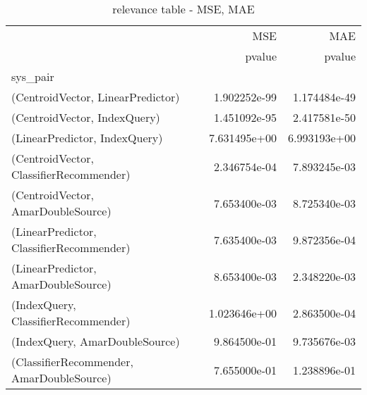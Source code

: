 \documentclass[11pt]{article}
\begin{document}
\begin{table}[H]
\centering
\caption{relevance table - MSE, MAE}
\begin{tabular}{lrr}
\toprule
{} &           MSE &           MAE \\
{} &        pvalue &        pvalue \\
sys\_pair                                  &               &               \\
\midrule
(CentroidVector, LinearPredictor)         &  1.902252e-99 &  1.174484e-49 \\
(CentroidVector, IndexQuery)              &  1.451092e-95 &  2.417581e-50 \\
(LinearPredictor, IndexQuery)             &  7.631495e+00 &  6.993193e+00 \\
(CentroidVector, ClassifierRecommender)   &  2.346754e-04 &  7.893245e-03 \\
(CentroidVector, AmarDoubleSource)        &  7.653400e-03 &  8.725340e-03 \\
(LinearPredictor, ClassifierRecommender)  &  7.635400e-03 &  9.872356e-04 \\
(LinearPredictor, AmarDoubleSource)       &  8.653400e-03 &  2.348220e-03 \\
(IndexQuery, ClassifierRecommender)       &  1.023646e+00 &  2.863500e-04 \\
(IndexQuery, AmarDoubleSource)            &  9.864500e-01 &  9.735676e-03 \\
(ClassifierRecommender, AmarDoubleSource) &  7.655000e-01 &  1.238896e-01 \\
\bottomrule
\end{tabular}
\end{table}
\end{document}
